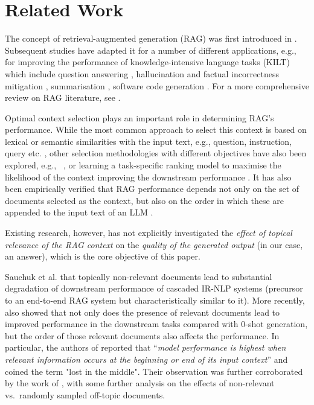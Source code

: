 \section{Related Work}
The concept of retrieval-augmented generation (RAG) was first introduced in \cite{ragInKnowledgeIntensiveNLP}. Subsequent studies have adapted it for a number of different applications, e.g., for improving the performance of knowledge-intensive language tasks (KILT) \cite{petroni-etal-2021-kilt} which include question answering \cite{kwiatkowski-etal-2019-natural,talmor-etal-2019-commonsenseqa}, hallucination and factual incorrectness mitigation \cite{FLARE}, summarisation \cite{edge2024localglobalgraphrag}, software code generation \cite{li2023acecoderutilizingexistingcode}. For a more comprehensive review on RAG literature, see \cite{ragsurvey,ragReview}.

Optimal context selection plays an important role in determining RAG's performance. While the most common approach to select this context is based on lexical or semantic similarities with the input text, e.g., question, instruction, query etc. \cite{liu-etal-2022-makes,demoRetrieveInICL}, other selection methodologies with different objectives have also been explored, e.g., ~\cite{levy-etal-2023-diverse},
or learning a task-specific ranking model to maximise the likelihood of the  
context improving the downstream performance \cite{rubin-etal-2022-learning}.
It has also been empirically verified that RAG performance depends not only on the set of documents selected as the context, but also on the order in which these are appended to the input text of an LLM \cite{DBLP:conf/acl/KumarT21,lu-etal-2022-fantastically}.

Existing research, however, has not explicitly investigated the \textit{effect of topical relevance of the RAG context} on the \textit{quality of the generated output} (in our case, an answer), which is the core objective of this paper.


Sauchuk et al. \cite{roleOfRelevanceInNLP}  that topically non-relevant documents lead to substantial degradation of downstream performance of cascaded IR-NLP systems (precursor to an end-to-end RAG system but characteristically similar to it). {More recently,} \cite{powerOfNoise,lostInTheMiddle} also showed that not only does the presence of relevant documents lead to improved performance in the downstream tasks compared with 0-shot generation, but the order of those relevant documents also affects the performance.
In particular, the authors of \cite{lostInTheMiddle} reported that
``\textit{model performance is highest when relevant information occurs at the beginning or end of its input context}'' and coined the term "lost in the middle". Their observation was further corroborated by the work of \cite{powerOfNoise}, with some further analysis on the effects of non-relevant vs.\ randomly sampled off-topic documents.

